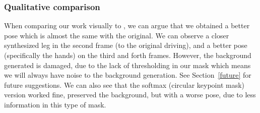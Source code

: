 \documentclass{article}
\begin{document}
\subsubsection{Qualitative comparison}
When comparing our work visually to \cite{siarohin2020order}, we can argue
that we obtained a better pose which is almost the same with the original.
We can observe a closer synthesized leg in the second frame (to the
original driving), and a better pose (specifically the hands) on the third and
forth frames.
However, the background generated is damaged, due to the lack of
thresholding in our mask which means we will always have noise
to the background generation.
See Section~\ref{future} for future suggestions.
We can also see that the softmax (circular keypoint mask) version worked
fine, preserved the background, but with a worse pose, due to less
information in this type of mask.
\end{document}
